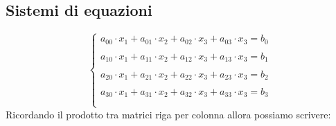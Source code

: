 \documentclass[10pt,a4paper]{article}
\begin{document}
%
%
%

\subsection{Sistemi di equazioni}
\[ \left\{
\begin{array}{rl}
a_{00}\cdot x_1+a_{01}\cdot x_2+a_{02}\cdot x_3+a_{03}\cdot x_3=b_0\\\\
a_{10}\cdot x_1+a_{11}\cdot x_2+a_{12}\cdot x_3+a_{13}\cdot x_3=b_1\\\\
a_{20}\cdot x_1+a_{21}\cdot x_2+a_{22}\cdot x_3+a_{23}\cdot x_3=b_2\\\\
a_{30}\cdot x_1+a_{31}\cdot x_2+a_{32}\cdot x_3+a_{33}\cdot x_3=b_3\\\\
\end{array}
\right.   \]
Ricordando il prodotto tra matrici riga per colonna allora possiamo scrivere:
\end{document}
